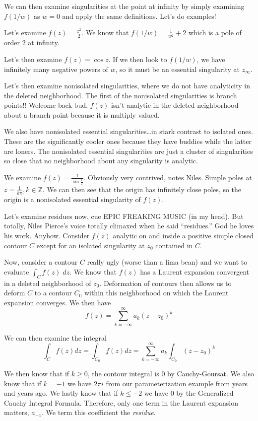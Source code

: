 \documentclass[10pt]{report}
\begin{document}
We can then examine singularities at the point at infinity by simply examining $f(1/w)$ as $w = 0$ and apply the same definitions. Let's do examples!

Let's examine $f(z) = \frac{z^2}{2}$. We know that $f(1/w) = \frac{1}{w^2} + 2$ which is a pole of order $2$ at infinity.

Let's then examine $f(z) = \cos z$. If we then look to $f(1/w)$, we have infinitely many negative powers of $w$, so it must be an essential singularity at $z_{\infty}$.

Let's then examine nonisolated singularities, where we do not have analyticity in the deleted neighborhood. The first of the nonisolated singularities is branch points!! Welcome back bud. $f(z)$ isn't analytic in the deleted neighborhood about a branch point because it is multiply valued.

We also have nonisolated essential singularities\dots in stark contrast to isolated ones. These are the significantly cooler ones because they have buddies while the latter are loners. The nonisolated essential singularities are just a cluster of singularities so close that no neighborhood about any singularity is analytic.

We examine $f(z) = \frac{1}{\sin \frac{1}{z}}$. Obviously very contrived, notes Niles. Simple poles at $z=\frac{1}{k\pi}, k \in\mathbb{Z}$. We can then see that the origin has infinitely close poles, so the origin is a nonisolated essential singularity of $f(z)$. 

Let's examine residues now, cue EPIC FREAKING MUSIC (in my head). But totally, Niles Pierce's voice totally climaxed when he said ``residues.'' God he loves his work. Anyhow. Consider $f(z)$ analytic on and inside a positive simple closed contour $C$ except for an isolated singularity at $z_0$ contained in $C$. 

Now, consider a contour $C$ really ugly (worse than a lima bean) and we want to evaluate $\int_C f(z)\; dz$. We know that $f(z)$ has a Laurent expansion convergent in a deleted neighborhood of $z_0$. Deformation of contours then allows us to deform $C$ to a contour $C_0$ within this neighborhood on which the Laurent expansion converges. We then have 
$$f(z) = \sum_{k=-\infty}^\infty a_k\left( z-z_0 \right)^k$$

We can then examine the integral
$$\int_C f(z) dz = \int_{C_0}f(z) dz = \sum_{k=-\infty}^\infty a_k \int_{C_0} (z-z_0)^k$$

We then know that if $k \geq 0$, the contour integral is $0$ by Cauchy-Goursat. We also know that if $k=-1$ we have $2\pi i$ from our parameterization example from years and years ago. We lastly know that if $k \leq -2$ we have $0$ by the Generalized Cauchy Integral Formula. Therefore, only one term in the Laurent expansion matters, $a_{-1}$. We term this coefficient the \emph{residue}. 
\end{document}
